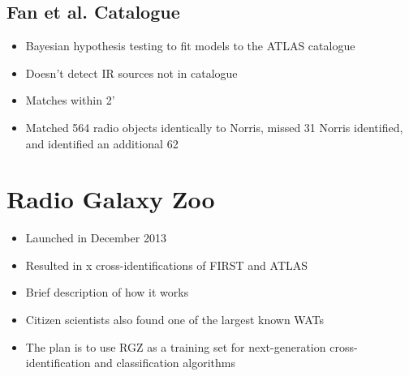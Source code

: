        \subsection{Fan et al. Catalogue}
        \label{sec:fan}

            \begin{itemize}
                \item Bayesian hypothesis testing to fit models to the ATLAS catalogue
                \item Doesn't detect IR sources not in catalogue
                \item Matches within 2'
                \item Matched 564 radio objects identically to Norris, missed 31 Norris identified, and identified an additional 62
            \end{itemize}

    \section{Radio Galaxy Zoo}
    \label{sec:radio-galaxy-zoo}

        \begin{itemize}
            \item Launched in December 2013
            \item Resulted in x cross-identifications of FIRST and ATLAS
            \item Brief description of how it works
            \item Citizen scientists also found one of the largest known WATs \cite{banfield16}
            \item The plan is to use RGZ as a training set for next-generation cross-identification and classification algorithms
        \end{itemize}

